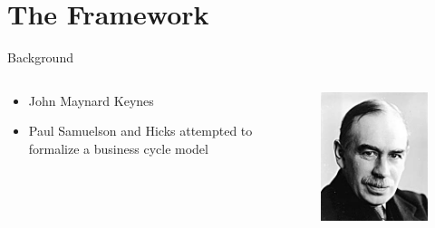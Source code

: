 \documentclass{beamer}
\begin{document}
\section{The Framework}
\begin{frame}{Background}
	\begin{columns}
		\begin{column}{0.5\textwidth}
			\begin{itemize}
					\item
						John Maynard Keynes

					\item
						Paul Samuelson and Hicks attempted to formalize a business cycle model\autocite{Puu2003}
				\end{itemize}
		\end{column}
		\begin{column}{0.5\textwidth}
			\begin{figure}
				\centering
				\includegraphics[width=\textwidth]{keynes.jpg}
			\end{figure}
		\end{column}
	\end{columns}
\end{frame}
\end{document}
